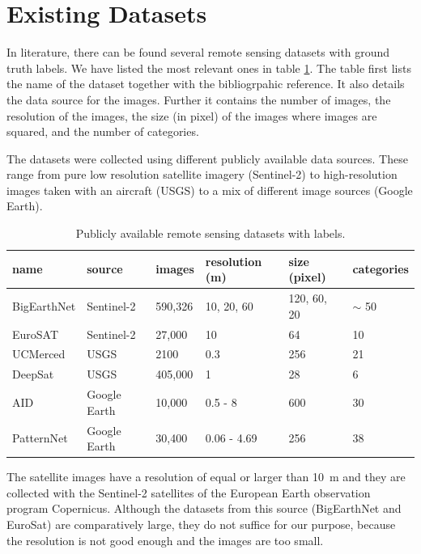 \section{Existing Datasets}

In literature, there can be found several remote sensing datasets with ground truth labels. We have listed the most relevant ones in table \ref{table:datasets}. The table first lists the name of the dataset together with the bibliogrpahic reference. It also details the data source for the images. Further it contains the number of images, the resolution of the images, the size (in pixel) of the images where images are squared, and the number of categories.

The datasets were collected using different publicly available data sources. These range from pure low resolution satellite imagery (Sentinel-2) to high-resolution images taken with an aircraft (USGS) to a mix of different image sources (Google Earth). 

\begin{table}[h!]
	\begin{tabular}{l | l | l | l | l | l }
	name & source & images & resolution (m) & size (pixel) & categories \\
	\hline
	BigEarthNet \parencite{sumbul2019} & Sentinel-2 & 590,326 & 10, 20, 60 & 120, 60, 20 & $\sim$ 50 \\
	EuroSAT \parencite{helber2017}	& Sentinel-2 & 27,000  & 10 & 64  & 10 \\
	UCMerced \parencite{yang2010} & USGS & 2100 & 0.3 & 256 & 21 \\
	DeepSat \parencite{basu2015}  & USGS  & 405,000 & 1 & 28 & 6  \\
	AID \parencite{xia2016} & Google Earth & 10,000  & 0.5 - 8  & 600 & 30 \\
	PatternNet \parencite{zhou2017} & Google Earth & 30,400 & 0.06 - 4.69 & 256 & 38 \\
	\end{tabular}
	\caption{Publicly available remote sensing datasets with labels.}
	\label{table:datasets}	
\end{table}

The satellite images have a resolution of equal or larger than 10~m and they are collected with the Sentinel-2 satellites of the European Earth observation program Copernicus. Although the datasets from this source (BigEarthNet and EuroSat) are comparatively large, they do not suffice for our purpose, because the resolution is not good enough and the images are too small.

